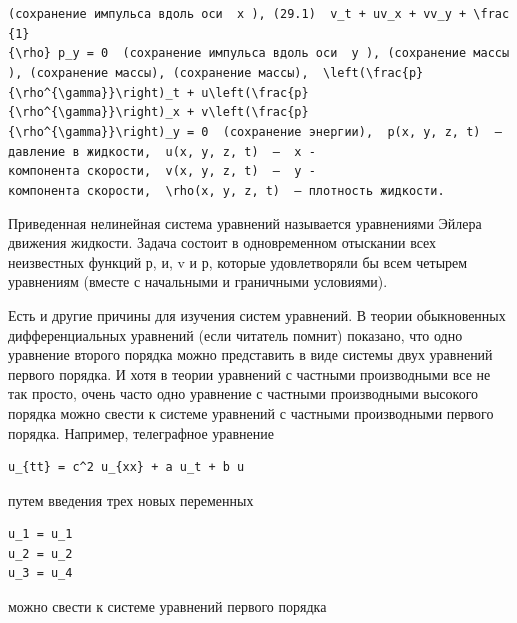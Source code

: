 \documentclass[
  ukrainian,
]{article}
\begin{document}
\texttt{(сохранение\ импульса\ вдоль\ оси\ \ \textquotesingle{}x\textquotesingle{}\ ),\ (29.1)\ \ \textquotesingle{}v\_t\ +\ uv\_x\ +\ vv\_y\ +\ \textbackslash{}frac\{1\}\{\textbackslash{}rho\}\ p\_y\ =\ 0\textquotesingle{}\ \ (сохранение\ импульса\ вдоль\ оси\ \ \textquotesingle{}y\textquotesingle{}\ ),\ (сохранение\ массы),\ (сохранение\ массы),\ (сохранение\ массы),\ \ \textquotesingle{}\textbackslash{}left(\textbackslash{}frac\{p\}\{\textbackslash{}rho\^{}\{\textbackslash{}gamma\}\}\textbackslash{}right)\_t\ +\ u\textbackslash{}left(\textbackslash{}frac\{p\}\{\textbackslash{}rho\^{}\{\textbackslash{}gamma\}\}\textbackslash{}right)\_x\ +\ v\textbackslash{}left(\textbackslash{}frac\{p\}\{\textbackslash{}rho\^{}\{\textbackslash{}gamma\}\}\textbackslash{}right)\_y\ =\ 0\textquotesingle{}\ \ (сохранение\ энергии),\ \ \textquotesingle{}p(x,\ y,\ z,\ t)\textquotesingle{}\ \ —\ давление\ в\ жидкости,\ \ \textquotesingle{}u(x,\ y,\ z,\ t)\textquotesingle{}\ \ —\ \ \textquotesingle{}x\textquotesingle{}\ -компонента\ скорости,\ \ \textquotesingle{}v(x,\ y,\ z,\ t)\textquotesingle{}\ \ —\ \ \textquotesingle{}y\textquotesingle{}\ -компонента\ скорости,\ \ \textquotesingle{}\textbackslash{}rho(x,\ y,\ z,\ t)\textquotesingle{}\ \ —\ плотность\ жидкости.}

Приведенная нелинейная система уравнений называется уравнениями Эйлера
движения жидкости. Задача состоит в одновременном отыскании всех
неизвестных функций р, и, v и р, которые удовлетворяли бы всем четырем
уравнениям (вместе с начальными и граничными условиями).

Есть и другие причины для изучения систем уравнений. В теории
обыкновенных дифференциальных уравнений (если читатель помнит) показано,
что одно уравнение второго порядка можно представить в виде системы двух
уравнений первого порядка. И хотя в теории уравнений с частными
производными все не так просто, очень часто одно уравнение с частными
производными высокого порядка можно свести к системе уравнений с
частными производными первого порядка. Например, телеграфное уравнение

\begin{verbatim}
u_{tt} = c^2 u_{xx} + a u_t + b u
\end{verbatim}

путем введения трех новых переменных

\begin{verbatim}
u_1 = u_1
u_2 = u_2
u_3 = u_4
\end{verbatim}

можно свести к системе уравнений первого порядка
\end{document}
